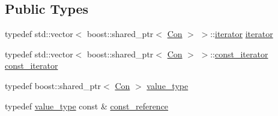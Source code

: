 \subsection*{Public Types}
\begin{DoxyCompactItemize}
\item 
typedef std::vector$<$ boost::shared\_\-ptr$<$ \hyperlink{class_con}{Con} $>$ $>$::\hyperlink{class_con_container_a5dc8aab66a22fc25b7e700b51265b577}{iterator} \hyperlink{class_con_container_a5dc8aab66a22fc25b7e700b51265b577}{iterator}
\item 
typedef std::vector$<$ boost::shared\_\-ptr$<$ \hyperlink{class_con}{Con} $>$ $>$::\hyperlink{class_con_container_ac314ee4e351b3a5f595cd1de74fb3b5e}{const\_\-iterator} \hyperlink{class_con_container_ac314ee4e351b3a5f595cd1de74fb3b5e}{const\_\-iterator}
\item 
typedef boost::shared\_\-ptr$<$ \hyperlink{class_con}{Con} $>$ \hyperlink{class_con_container_a08881a149e3a285eba67a4c8cff92a9e}{value\_\-type}
\item 
typedef \hyperlink{class_con_container_a08881a149e3a285eba67a4c8cff92a9e}{value\_\-type} const \& \hyperlink{class_con_container_ac644eca2f5ee432a6070fd1d397b3741}{const\_\-reference}
\end{DoxyCompactItemize}
